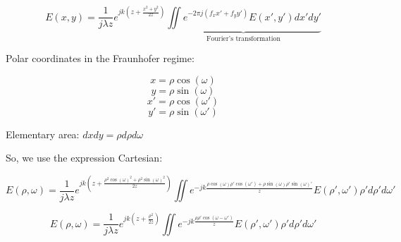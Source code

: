 \documentclass[10pt,a4paper]{article}
\begin{document}
\[E(x,y)=\frac{1}{j\lambda z} e^{jk\left(z+\frac{x^2+y^2}{2z}\right)}\underbrace{\iint e^{-2\pi j(f_xx'+f_yy')}E(x',y')dx'dy'}_\text{Fourier's transformation}\]

Polar coordinates in the Fraunhofer regime:

\[x=\rho \cos(\omega) \]
\[y=\rho \sin(\omega) \]
\[x'=\rho \cos(\omega') \]
\[y'=\rho \sin(\omega') \]

Elementary area: $dxdy=\rho d\rho d\omega$

So, we use the expression Cartesian:

\[E(\rho,\omega)=\frac{1}{j\lambda z} e^{jk\left(z+\frac{\rho^2 \cos(\omega)^2+\rho^2 \sin(\omega)^2}{2z}\right)}\iint e^{-jk\frac{\rho \cos(\omega)\rho' \cos(\omega')+\rho \sin(\omega)\rho' \sin(\omega)'}{z}}E(\rho',\omega')\rho' d\rho'd\omega'\]

\[E(\rho,\omega)=\frac{1}{j\lambda z} e^{jk\left(z+\frac{\rho^2}{2z}\right)}\iint e^{-jk\frac{\rho\rho'\cos(\omega-\omega')}{z}}E(\rho',\omega')\rho' d\rho'd\omega'\]
\end{document}
